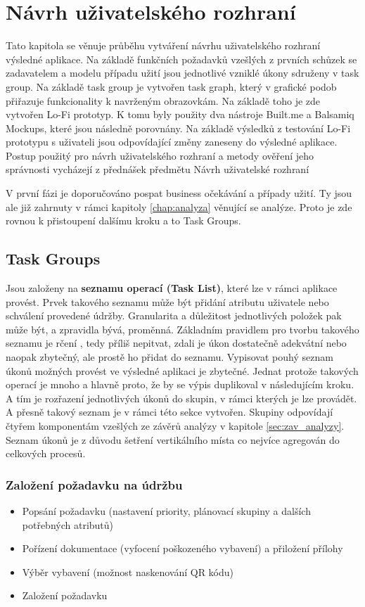 \documentclass[thesis=M,czech]{FITthesis}[2012/06/26]
\begin{document}
\chapter{Návrh uživatelského rozhraní}
Tato kapitola se věnuje průběhu vytváření návrhu uživatelského rozhraní výsledné aplikace. Na základě funkčních požadavků vzešlých z prvních schůzek se zadavatelem a modelu případu užití jsou jednotlivé vzniklé úkony sdruženy v task group. Na základě task group je vytvořen task graph, který v grafické podob přiřazuje funkcionality k navrženým obrazovkám. Na základě toho je zde vytvořen Lo-Fi prototyp. K tomu byly použity dva nástroje Built.me a Balsamiq Mockups, které jsou následně porovnány. Na základě výsledků z testování Lo-Fi prototypu s uživateli jsou odpovídající změny zaneseny do výsledné aplikace. Postup použitý pro návrh uživatelského rozhraní a metody ověření jeho správnosti vycházejí z přednášek předmětu Návrh uživatelské rozhraní \cite{nur}

V první fázi je doporučováno pospat business očekávání a případy užití. Ty jsou ale již zahrnuty v rámci kapitoly \ref{chap:analyza} věnující se analýze. Proto je zde rovnou k přistoupení dalšímu kroku a to Task Groups.

\section{Task Groups}
\label{sec:task_groups}
Jsou založeny na \textbf{seznamu operací (Task List)}, které lze v rámci aplikace provést. Prvek takového seznamu může být přidání atributu uživatele nebo schválení provedené údržby. Granularita a důležitost jednotlivých položek pak může být, a zpravidla bývá, proměnná. Základním pravidlem pro tvorbu takového seznamu je rčení , tedy příliš nepitvat, zdali je úkon dostatečně adekvátní nebo naopak zbytečný, ale prostě ho přidat do seznamu. Vypisovat pouhý seznam úkonů možných provést ve výsledné aplikaci je zbytečné. Jednat protože takových operací je mnoho a hlavně proto, že by se výpis duplikoval v následujícím kroku. A tím je rozřazení jednotlivých úkonů do skupin, v rámci kterých je lze provádět. A přesně takový seznam je v rámci této sekce vytvořen. Skupiny odpovídají čtyřem komponentám vzešlých ze závěrů analýzy v kapitole \ref{sec:zav_analyzy}. Seznam úkonů je z důvodu šetření vertikálního místa co nejvíce agregován do celkových procesů.

\subsection{Založení požadavku na údržbu}
\begin{itemize}
	\item
	Popsání požadavku (nastavení priority, plánovací skupiny a dalších potřebných atributů)
	\item
	Pořízení dokumentace (vyfocení poškozeného vybavení) a přiložení přílohy
	\item
	Výběr vybavení (možnost naskenování QR kódu)
	\item
	Založení požadavku
\end{itemize} 
\end{document}
